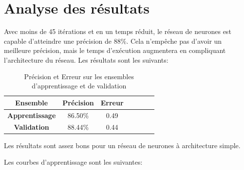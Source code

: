 \documentclass[a4paper,english,12pt]{article}
\begin{document}
\section{Analyse des résultats}
Avec moins de 45 itérations et en un temps réduit, le réseau de neurones est capable d'atteindre une précision de 88\%. Cela n'empêche pas d'avoir un meilleure précision, mais le temps d'exécution augmentera en compliquant l'architecture du réseau. Les résultats sont les suivants:

\begin{table}[H]\centering
	\begin{tabular}{ccccccc}
		\toprule \textbf{Ensemble} & \textbf{Précision} & \textbf{Erreur}\\    \midrule
		\textbf{Apprentissage} & 86.50\% & 0.49
		\\    \midrule
		\textbf{Validation} & 88.44\% & 0.44  \\   
		\bottomrule	
	\end{tabular}
	\caption{Précision et Erreur sur les ensembles d'apprentissage et de validation\label{tab1}}
\end{table}

Les résultats sont assez bons pour un réseau de neurones à architecture simple.

\vspace{20em}

Les courbes d'apprentissage sont les suivantes:
\end{document}
